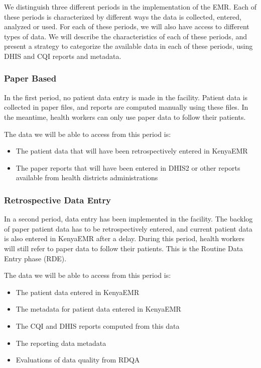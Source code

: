 \documentclass[a4paper,11pt,draft,twoside]{article}
\begin{document}
We distinguish three different periods in the implementation of the EMR. Each of these periods is characterized by different ways the data is collected, entered, analyzed or used. For each of these periods, we will also have access to different types of data. We will describe the characteristics of each of these periods, and present a strategy to categorize the available data in each of these periods, using DHIS and CQI reports and metadata.

        \subsubsection{Paper Based}

In the first period, no patient data entry is made in the facility. Patient data is collected in paper files, and reports are computed manually using these files. In the meantime, health workers can only use paper data to follow their patients.

The data we will be able to access from this period is:
\begin{itemize}
\item	The patient data that will have been retrospectively entered in KenyaEMR
\item	The paper reports that will have been entered in DHIS2 or other reports available from health districts administrations
\end{itemize}

        \subsubsection{Retrospective Data Entry}

In a second period, data entry has been implemented in the facility. The backlog of paper patient data has to be retrospectively entered, and current patient data is also entered in KenyaEMR after a delay. During this period, health workers will still refer to paper data to follow their patients. This is the Routine Data Entry phase (RDE).

The data we will be able to access from this period is:
\begin{itemize}
\item	The patient data entered in KenyaEMR
\item	The metadata for patient data entered in KenyaEMR
\item	The CQI and DHIS reports computed from this data
\item	The reporting data metadata
\item	Evaluations of data quality from RDQA
\end{itemize}
\end{document}
